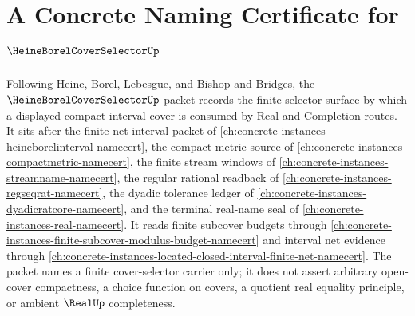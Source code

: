 \chapter{A Concrete Naming Certificate for $\HeineBorelCoverSelectorUp$}
\label{ch:concrete-instances-heine-borel-cover-selector-namecert}

Following Heine, Borel, Lebesgue, and Bishop and Bridges, the $\HeineBorelCoverSelectorUp$ packet records the finite selector surface by which a displayed compact interval cover is consumed by Real and Completion routes. It sits after the finite-net interval packet of \autoref{ch:concrete-instances-heineborelinterval-namecert}, the compact-metric source of \autoref{ch:concrete-instances-compactmetric-namecert}, the finite stream windows of \autoref{ch:concrete-instances-streamname-namecert}, the regular rational readback of \autoref{ch:concrete-instances-regseqrat-namecert}, the dyadic tolerance ledger of \autoref{ch:concrete-instances-dyadicratcore-namecert}, and the terminal real-name seal of \autoref{ch:concrete-instances-real-namecert}. It reads finite subcover budgets through \autoref{ch:concrete-instances-finite-subcover-modulus-budget-namecert} and interval net evidence through \autoref{ch:concrete-instances-located-closed-interval-finite-net-namecert}. The packet names a finite cover-selector carrier only; it does not assert arbitrary open-cover compactness, a choice function on covers, a quotient real equality principle, or ambient $\RealUp$ completeness.

